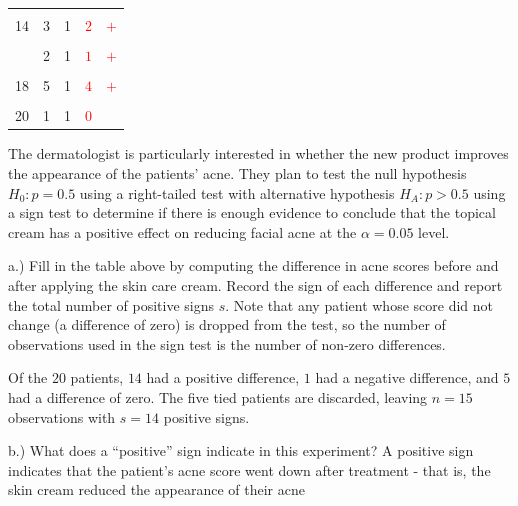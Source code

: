 \documentclass[
]{article}
\begin{document}
\begin{table}[H]
\begin{tabular}{rrrll}
\cellcolor{gray!10}{13} & \cellcolor{gray!10}{3} & \cellcolor{gray!10}{3} & \cellcolor{gray!10}{\textcolor{red}{$0$}} & \cellcolor{gray!10}{}\\
14 & 3 & 1 & \textcolor{red}{$2$} & \textcolor{red}{$+$}\\
\cellcolor{gray!10}{15} & \cellcolor{gray!10}{1} & \cellcolor{gray!10}{1} & \cellcolor{gray!10}{\textcolor{red}{$0$}} & \cellcolor{gray!10}{}\\
\addlinespace
16 & 2 & 1 & \textcolor{red}{$1$} & \textcolor{red}{$+$}\\
\cellcolor{gray!10}{17} & \cellcolor{gray!10}{4} & \cellcolor{gray!10}{1} & \cellcolor{gray!10}{\textcolor{red}{$3$}} & \cellcolor{gray!10}{\textcolor{red}{$+$}}\\
18 & 5 & 1 & \textcolor{red}{$4$} & \textcolor{red}{$+$}\\
\cellcolor{gray!10}{19} & \cellcolor{gray!10}{2} & \cellcolor{gray!10}{3} & \cellcolor{gray!10}{\textcolor{red}{$-1$}} & \cellcolor{gray!10}{\textcolor{red}{$-$}}\\
20 & 1 & 1 & \textcolor{red}{$0$} & \\
\bottomrule
\end{tabular}
\end{table}

The dermatologist is particularly interested in whether the new product
improves the appearance of the patients' acne. They plan to test the
null hypothesis \(H_0: p = 0.5\) using a right-tailed test with
alternative hypothesis \(H_A: p>0.5\) using a sign test to determine if
there is enough evidence to conclude that the topical cream has a
positive effect on reducing facial acne at the \(\alpha = 0.05\) level.

a.) Fill in the table above by computing the difference in acne scores
before and after applying the skin care cream. Record the sign of each
difference and report the total number of positive signs \(s\). Note
that any patient whose score did not change (a difference of zero) is
dropped from the test, so the number of observations used in the sign
test is the number of non-zero differences.

{Of the \(20\) patients, \(14\) had a positive difference, \(1\) had a
negative difference, and \(5\) had a difference of zero. The five tied
patients are discarded, leaving \(n = 15\) observations with \(s = 14\)
positive signs.}

b.) What does a ``positive'' sign indicate in this experiment? {A
positive sign indicates that the patient's acne score went down after
treatment - that is, the skin cream reduced the appearance of their
acne}
\end{document}
